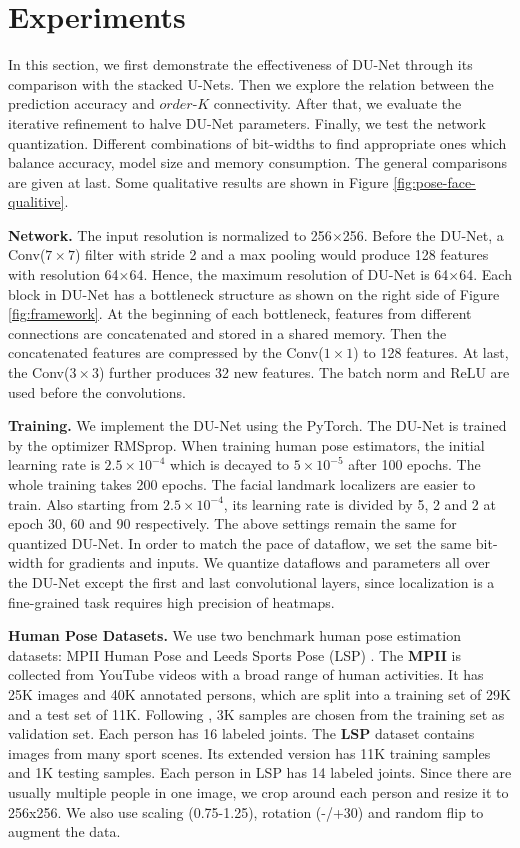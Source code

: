 
\section{Experiments}

In this section, we first demonstrate the effectiveness of DU-Net through its comparison with the stacked U-Nets. Then we explore the relation between the prediction accuracy and $order$-$K$ connectivity. After that, we evaluate the iterative refinement to halve DU-Net parameters. Finally, we test the network quantization. Different combinations of bit-widths to find appropriate ones which balance accuracy, model size and memory consumption. The general comparisons are given at last. Some qualitative results are shown in Figure \ref{fig:pose-face-qualitive}.

{\bf Network.} The input resolution is normalized to 256$\times$256. Before the DU-Net, a Conv($7\times 7$) filter with stride 2 and a max pooling would produce 128 features with resolution 64$\times$64. Hence, the maximum resolution of DU-Net is 64$\times$64. Each block in DU-Net has a bottleneck structure as shown on the right side of Figure \ref{fig:framework}. At the beginning of each bottleneck, features from different connections are concatenated and stored in a shared memory. Then the concatenated features are compressed by the Conv($1\times 1$) to 128 features. At last, the Conv($3\times 3$) further produces 32 new features. The batch norm and ReLU are used before the convolutions. 

{\bf Training.} We implement the DU-Net using the PyTorch. The DU-Net is trained by the optimizer RMSprop. When training human pose estimators, the initial learning rate is $2.5\times 10^{-4}$ which is decayed to $5\times 10^{-5}$ after 100 epochs. The whole training takes 200 epochs. The facial landmark localizers are easier to train. Also starting from $2.5\times 10^{-4}$, its learning rate is divided by 5, 2 and 2 at epoch 30, 60 and 90 respectively. The above settings remain the same for quantized
DU-Net. In order to match the pace of dataflow, we set the same bit-width for gradients and inputs. We quantize dataflows and parameters all over the DU-Net except the first and last convolutional layers, since localization is a fine-grained task requires high precision of heatmaps.

{\bf Human Pose Datasets.} We use two benchmark human pose estimation datasets: MPII Human Pose \cite{andriluka14cvpr} and Leeds Sports Pose (LSP) \cite{johnson2010lsp}. The {\bf MPII} is collected from YouTube videos with a broad range of human activities. It has 25K images and 40K annotated persons, which are split into a training set of 29K and a test set of 11K. Following \cite{tompson2015efficient}, 3K samples are chosen from the training set as validation set. Each person has 16 labeled joints. The {\bf LSP} dataset contains images from many sport scenes. Its extended version has 11K training samples and 1K testing samples. Each person in LSP has 14 labeled joints. Since there are usually multiple people in one image, we crop around each person and resize it to 256x256. We also use scaling (0.75-1.25), rotation (-/+30) and random flip to augment the data.

